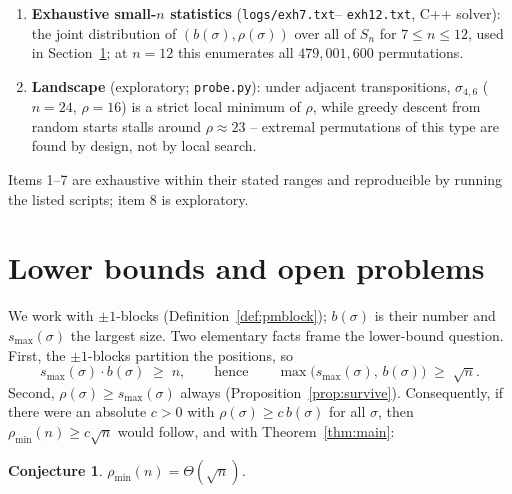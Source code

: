 \documentclass[11pt]{article}
\newtheorem{conjecture}[theorem]{Conjecture}
\theoremstyle{definition}
\newcommand{\pmin}{\rho_{\min}}
\newcommand{\smax}{s_{\max}}
\begin{document}
\begin{enumerate}
Every exact value equals $2a + 2b - 4$ and sits inside the proven window
$[2a{+}2b{-}7,\ 4a{+}2b]$ of \eqref{eq:twosided}; the two rows at $n = 480$ (differing
in $\rho$) illustrate that $\rho(\sigma_{a,b})$ tracks $a$ and $b$ separately, not just
their product. At $n = 720$ the ratio $0.150$ is far below any ratio that the
block-reversal experiments of Section~\ref{sec:halfbound} suggested was attainable.
\item \textbf{Exhaustive small-$n$ statistics} (\texttt{logs/exh7.txt}--%
\texttt{exh12.txt}, C++ solver): the joint distribution of $(b(\sigma), \rho(\sigma))$
over all of $S_n$ for $7 \le n \le 12$, used in Section~\ref{sec:disc}; at $n = 12$ this
enumerates all $479{,}001{,}600$ permutations.
\item \textbf{Landscape} (exploratory; \texttt{probe.py}): under adjacent
transpositions, $\sigma_{4,6}$ ($n = 24$, $\rho = 16$) is a strict local minimum of
$\rho$, while greedy descent from random starts stalls around $\rho \approx 23$ --
extremal permutations of this type are found by design, not by local search.
\end{enumerate}

Items 1--7 are exhaustive within their stated ranges and reproducible by running the
listed scripts; item 8 is exploratory.

\section{Lower bounds and open problems}\label{sec:disc}

We work with $\pm1$-blocks (Definition~\ref{def:pmblock}); $b(\sigma)$ is their number
and $\smax(\sigma)$ the largest size. Two elementary facts frame the lower-bound
question. First, the $\pm1$-blocks partition the positions, so
\[
\smax(\sigma) \cdot b(\sigma) \;\ge\; n,
\qquad\text{hence}\qquad
\max\bigl(\smax(\sigma),\, b(\sigma)\bigr) \;\ge\; \sqrt n .
\]
Second, $\rho(\sigma) \ge \smax(\sigma)$ always
(Proposition~\ref{prop:survive}). Consequently, if there were an absolute $c > 0$ with
$\rho(\sigma) \ge c\, b(\sigma)$ for all $\sigma$, then $\pmin(n) \ge c\sqrt n$ would
follow, and with Theorem~\ref{thm:main}:

\begin{conjecture}\label{conj:sqrt}
$\pmin(n) = \Theta(\sqrt n)$.
\end{conjecture}
\end{document}
